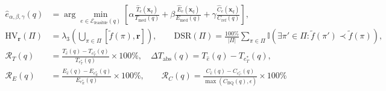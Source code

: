 \documentclass[10pt,a4paper]{article}
\begin{document}
\vspace{-3pt}
\begin{align}
\hat{e}_{\alpha,\beta,\gamma}(q) &= \arg\min_{e \in \mathcal{E}_{\text{feasible}}(q)} \left[ \alpha \frac{\hat{T}_e(\mathbf{x}_q)}{T_{\text{med}}(q)} + \beta \frac{\hat{E}_e(\mathbf{x}_q)}{E_{\text{med}}(q)} + \gamma \frac{\hat{C}_e(\mathbf{x}_q)}{C_{\text{ref}}(q)} \right], \nonumber \\
\mathrm{HV}_{\mathbf{r}}(\Pi) &= \lambda_3\!\left(\bigcup_{\pi \in \Pi} [\tilde{f}(\pi), \mathbf{r}]\right), \qquad \mathrm{DSR}(\Pi) = \frac{100\%}{|\Pi|} \sum_{\pi \in \Pi} \mathbb{I}\!\left(\exists \pi' \in \Pi : \tilde{f}(\pi') \prec \tilde{f}(\pi)\right), \nonumber \\
\mathcal{R}_T(q) &= \frac{T_{\hat{e}}(q) - T_{e_T^*}(q)}{T_{e_T^*}(q)} \times 100\%, \quad \Delta T_{\text{abs}}(q) = T_{\hat{e}}(q) - T_{e_T^*}(q), \nonumber \\
\mathcal{R}_E(q) &= \frac{E_{\hat{e}}(q) - E_{e_E^*}(q)}{E_{e_E^*}(q)} \times 100\%, \qquad \mathcal{R}_C(q) = \frac{C_{\hat{e}}(q) - C_{e_C^*}(q)}{\max(C_{\text{BQ}}(q), \epsilon)} \times 100\% \label{eq:pareto_regret}
\end{align}
\vspace{-2pt}
\end{document}
